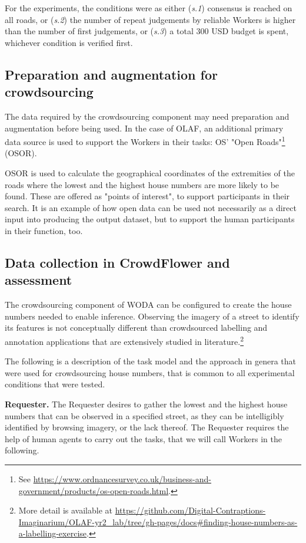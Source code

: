 For the experiments, the conditions were as either ({\it s.1}) consensus is reached on all roads, or ({\it s.2}) the number of repeat judgements by reliable Workers is higher than the number of first judgements, or ({\it s.3}) a total 300 USD budget is spent, whichever condition is verified first.

\subsection{Preparation and augmentation for crowdsourcing} 

The data required by the crowdsourcing component may need preparation and augmentation before being used. In the case of OLAF, an additional primary data source is used to support the Workers in their tasks: OS' "Open Roads"\footnote{See \url{https://www.ordnancesurvey.co.uk/business-and-government/products/os-open-roads.html}.} (OSOR). 

OSOR is used to calculate the geographical coordinates of the extremities of the roads where the lowest and the highest house numbers are more likely to be found. These are offered as "points of interest", to support participants in their search. It is an example of how open data can be used not necessarily as a direct input into producing the output dataset, but to support the human participants in their function, too.

\subsection{Data collection in CrowdFlower and assessment}

The crowdsourcing component of WODA can be configured to create the house numbers needed to enable inference. Observing the imagery of a street to identify its features is not conceptually different than crowdsourced labelling and annotation applications that are extensively studied in literature.\footnote{More detail is available at \url{https://github.com/Digital-Contraptions-Imaginarium/OLAF-yr2_lab/tree/gh-pages/docs#finding-house-numbers-as-a-labelling-exercise}.}

The following is a description of the task model and the approach in genera that were used for crowdsourcing house numbers, that is common to all experimental conditions that were tested.

\textbf{Requester.} The Requester desires to gather the lowest and the highest house numbers that can be observed in a specified street, as they can be intelligibly identified by browsing imagery, or the lack thereof. The Requester requires the help of human agents to carry out the tasks, that we will call Workers in the following.

